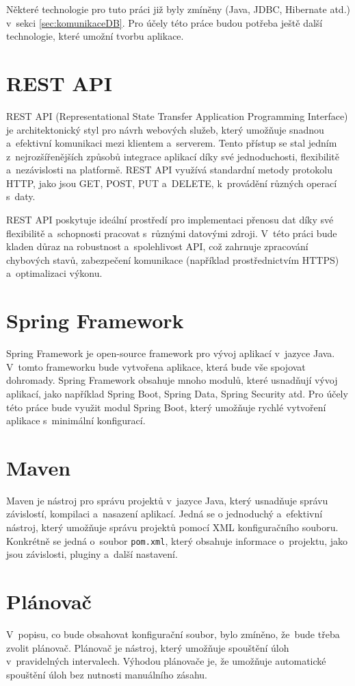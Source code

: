 Některé technologie pro tuto práci již byly zmíněny (Java, JDBC, Hibernate atd.) v~sekci \ref{sec:komunikaceDB}.  
Pro účely této práce budou potřeba ještě další technologie, které umožní tvorbu aplikace.

\section{REST API}
REST API (Representational State Transfer Application Programming Interface) je architektonický  
styl pro návrh webových služeb, který umožňuje snadnou a~efektivní komunikaci mezi klientem a~serverem.  
Tento přístup se stal jedním z~nejrozšířenějších způsobů integrace aplikací díky své jednoduchosti,  
flexibilitě a~nezávislosti na platformě. REST API využívá standardní metody protokolu HTTP, jako jsou  
GET, POST, PUT a~DELETE, k~provádění různých operací s~daty.

REST API poskytuje ideální prostředí pro implementaci přenosu dat díky své flexibilitě a~schopnosti  
pracovat s~různými datovými zdroji. V~této práci bude kladen důraz na robustnost a~spolehlivost API,  
což zahrnuje zpracování chybových stavů, zabezpečení komunikace (například prostřednictvím HTTPS)  
a~optimalizaci výkonu.  
\cite{rest_api}

\section{Spring Framework}
Spring Framework je open-source framework pro vývoj aplikací v~jazyce Java.  
V~tomto frameworku bude vytvořena aplikace, která bude vše spojovat dohromady.  
Spring Framework obsahuje mnoho modulů, které usnadňují vývoj aplikací,  
jako například Spring Boot, Spring Data, Spring Security atd.  
Pro účely této práce bude využit modul Spring Boot, který umožňuje rychlé  
vytvoření aplikace s~minimální konfigurací.  
\cite{spring_framework}

\section{Maven}
Maven je nástroj pro správu projektů v~jazyce Java, který usnadňuje správu závislostí,
kompilaci a~nasazení aplikací. Jedná se o jednoduchý a~efektivní nástroj, který umožňuje
správu projektů pomocí XML konfiguračního souboru.
Konkrétně se jedná o~soubor \texttt{pom.xml}, který obsahuje informace o~projektu, 
jako jsou závislosti, pluginy a~další nastavení.
\cite{maven}

\section{Plánovač}
V~popisu, co bude obsahovat konfigurační soubor, bylo zmíněno, že~bude třeba zvolit plánovač.  
Plánovač je nástroj, který umožňuje spouštění úloh v~pravidelných intervalech.  
Výhodou plánovače je, že umožňuje automatické spouštění úloh bez nutnosti manuálního zásahu.  

